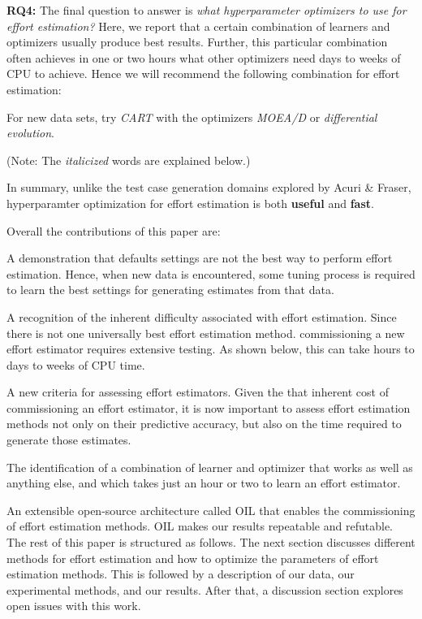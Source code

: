 {\bf RQ4:} The
final question to  answer is {\em what  hyperparameter   optimizers  to  use  for  effort
estimation?} Here, we report that a certain combination  of learners and optimizers usually
produce best results. Further, this
particular combination  often achieves in one or two
hours what other optimizers need days to weeks of CPU to achieve. Hence we will recommend 
the following combination for effort estimation:
\begin{result}{4}
For new data sets, try {\em CART} with the optimizers  {\em MOEA/D} or 
{\em differential evolution}.
\end{result}
(Note: The {\it italicized} words are explained below.)

In summary, unlike the test case generation domains explored by Acuri \& Fraser,
hyperparamter optimization for effort estimation is both {\bf useful} and {\bf fast}.


Overall the contributions of this paper are:
\bi
\item A demonstration that defaults settings are not the best way to perform effort estimation. Hence, when new
data is encountered, some tuning process is required
to learn the best settings for generating estimates
from that data.
\item A recognition of the inherent difficulty associated
with effort estimation.  Since there is not one universally best effort estimation method.
commissioning a new effort estimator requires
extensive testing.  
As shown below, this can take  hours to days to weeks of CPU time. 
\item
A new criteria for assessing effort estimators.
Given the 
that inherent cost of commissioning an effort estimator,
it is now important to assess effort estimation methods
not only on their predictive accuracy, but also on the time
required to generate those estimates.
\item
The identification of a  combination
of learner and optimizer that  works
as well as  anything else, and which takes just
an hour or two to learn an effort estimator.
\item An extensible open-source architecture called OIL that enables the commissioning of effort estimation methods.
OIL makes our results   repeatable and refutable.
\ei
The rest of this paper is structured as follows.
The next section discusses different methods for effort estimation and how to optimize
the parameters of effort estimation methods. This is followed by a description of our data, our experimental
methods, and our results. After that, a discussion section explores open issues with this work. 

